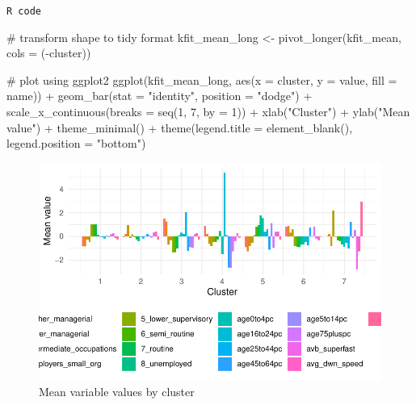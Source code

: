 \documentclass[
  letterpaper,
  DIV=11,
  numbers=noendperiod]{scrreprt}
\newenvironment{Shaded}{\begin{snugshade}}{\end{snugshade}}
\newcommand{\AttributeTok}[1]{\textcolor[rgb]{0.40,0.45,0.13}{#1}}
\newcommand{\CommentTok}[1]{\textcolor[rgb]{0.37,0.37,0.37}{#1}}
\newcommand{\DecValTok}[1]{\textcolor[rgb]{0.68,0.00,0.00}{#1}}
\newcommand{\FunctionTok}[1]{\textcolor[rgb]{0.28,0.35,0.67}{#1}}
\newcommand{\NormalTok}[1]{\textcolor[rgb]{0.00,0.23,0.31}{#1}}
\newcommand{\OtherTok}[1]{\textcolor[rgb]{0.00,0.23,0.31}{#1}}
\newcommand{\SpecialCharTok}[1]{\textcolor[rgb]{0.37,0.37,0.37}{#1}}
\newcommand{\StringTok}[1]{\textcolor[rgb]{0.13,0.47,0.30}{#1}}
\begin{document}
\begin{codelisting}

\caption{\texttt{R code}}

\begin{Shaded}
\begin{Highlighting}[]
\CommentTok{\# transform shape to tidy format}
\NormalTok{kfit\_mean\_long }\OtherTok{\textless{}{-}} \FunctionTok{pivot\_longer}\NormalTok{(kfit\_mean, }\AttributeTok{cols =}\NormalTok{ (}\SpecialCharTok{{-}}\NormalTok{cluster))}

\CommentTok{\# plot using ggplot2}
\FunctionTok{ggplot}\NormalTok{(kfit\_mean\_long, }\FunctionTok{aes}\NormalTok{(}\AttributeTok{x =}\NormalTok{ cluster, }\AttributeTok{y =}\NormalTok{ value, }\AttributeTok{fill =}\NormalTok{ name)) }\SpecialCharTok{+} \FunctionTok{geom\_bar}\NormalTok{(}\AttributeTok{stat =} \StringTok{"identity"}\NormalTok{,}
    \AttributeTok{position =} \StringTok{"dodge"}\NormalTok{) }\SpecialCharTok{+} \FunctionTok{scale\_x\_continuous}\NormalTok{(}\AttributeTok{breaks =} \FunctionTok{seq}\NormalTok{(}\DecValTok{1}\NormalTok{, }\DecValTok{7}\NormalTok{, }\AttributeTok{by =} \DecValTok{1}\NormalTok{)) }\SpecialCharTok{+} \FunctionTok{xlab}\NormalTok{(}\StringTok{"Cluster"}\NormalTok{) }\SpecialCharTok{+}
    \FunctionTok{ylab}\NormalTok{(}\StringTok{"Mean value"}\NormalTok{) }\SpecialCharTok{+} \FunctionTok{theme\_minimal}\NormalTok{() }\SpecialCharTok{+} \FunctionTok{theme}\NormalTok{(}\AttributeTok{legend.title =} \FunctionTok{element\_blank}\NormalTok{(),}
    \AttributeTok{legend.position =} \StringTok{"bottom"}\NormalTok{)}
\end{Highlighting}
\end{Shaded}

\end{codelisting}

\begin{figure}[H]

{\centering \includegraphics{01-geodemographics_files/figure-pdf/fig-geo-plot-those-clusters-with-a-graph-1.pdf}

}

\caption{\label{fig-geo-plot-those-clusters-with-a-graph}Mean variable
values by cluster}

\end{figure}
\end{document}
